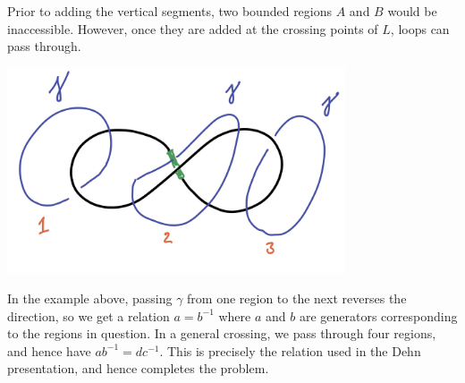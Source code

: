\begin{homework}[e]
\begin{prf}
  Prior to adding the vertical segments, two bounded regions $A$ and $B$ would be inaccessible. However, once they are added at the crossing points of $L$, loops can pass through.
    \begin{center}
      \includegraphics[width=10cm]{figures/hwk4-fig10.png}
      \label{fig:prob1.1}
    \end{center}
  In the example above, passing $\gamma$ from one region to the next reverses the direction, so we get a relation $a = b^{-1}$ where $a$ and $b$ are generators corresponding to the regions in question. In a general crossing, we pass through four regions, and hence have $ab^{-1} = dc^{-1}$. This is precisely the relation used in the Dehn presentation, and hence completes the problem.
\end{prf}
\end{homework}

